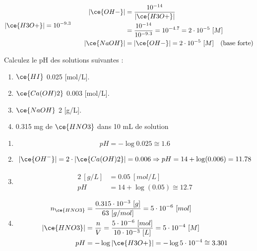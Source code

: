 \documentclass[
  11pt,
  a4paper,
  openany]{book}
\providecommand{\tightlist}{%
  \setlength{\itemsep}{0pt}\setlength{\parskip}{0pt}}
\begin{document}
\begin{Answer}
\[
\begin{split}
|\ce{H3O+}| = 10^{-9.3}
\end{split}
\qquad
\begin{split}
|\ce{OH-}| &= \frac{10^{-14}}{|\ce{H3O+}|} \\
  &= \frac{10^{-14}}{10^{-9.3}} = 10^{-4.7} = 2 \cdot 10^{-5}\ [M] \\
|\ce{NaOH}| &= |\ce{OH-}| = 2 \cdot 10^{-5}\ [M] \quad \text{(base forte)}
\end{split}
\]

\end{Answer}

\clearpage

\begin{Exercise}

Calculez le pH des solutions suivantes :

\begin{enumerate}
\def\labelenumi{\alph{enumi}.}
\tightlist
\item
  \(\ce{HI}\) 0.025 {[}mol/L{]}.
\item
  \(\ce{Ca(OH)2}\) 0.003 {[}mol/L{]}.
\item
  \(\ce{NaOH}\) 2 {[}g/L{]}.
\item
  0.315 mg de \(\ce{HNO3}\) dans 10 mL de solution
\end{enumerate}

\end{Exercise}

\begin{Answer}

\begin{enumerate}
\def\labelenumi{\alph{enumi}.}
\tightlist
\item
  \[
  pH = - \log 0.025 \cong 1.6
  \]
\item
  \[
  |\ce{OH^-}| = 2 \cdot |\ce{Ca(OH)2}| = 0.006 \Rightarrow pH = 14 + \log(0.006) = 11.78
  \]
\item
  \[
  \begin{split}
    2\ [g/L] &= 0.05\ [mol/L] \\
    pH &= 14 + \log(0.05) \cong 12.7
  \end{split}
  \]
\item
  \[
  \begin{split}
    n_{\ce{HNO3}} &= \frac{0.315 \cdot 10^{-3}\ [g]}{63\ [g/mol]} = 5 \cdot 10^{-6}\ [mol] \\
    |\ce{HNO3}| &= \frac{n}{V} = \frac{5 \cdot 10^{-6}\ [mol]}{10 \cdot 10^{-3}\ [L]} = 5 \cdot 10^{-4}\ [M] \\
    pH &= - \log |\ce{H3O+}| = - \log 5 \cdot 10^{-4} \cong 3.301
   \end{split}
  \]
\end{enumerate}

\end{Answer}
\end{document}
